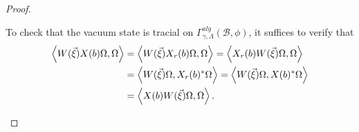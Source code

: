 \documentclass[10pt,a4paper]{amsart}
\newcommand{\br}{\medskip\noindent}
\newcommand{\ip}[2]{\left \langle{#1},{#2} \right \rangle}
\newcommand{\mc}[1]{\mathcal{#1}}
\begin{document}
\begin{proof}
\begin{enumerate}
\br
To check that the vacuum state is tracial on $\Gamma^{alg}_{\gamma, \Lambda}(\mc{B}, \phi)$, it suffices to verify that
\[
\begin{split}
\ip{W(\vec{\xi}) X(b) \Omega}{\Omega}
& = \ip{W(\vec{\xi}) X_r(b) \Omega}{\Omega}
= \ip{X_r(b) W(\vec{\xi}) \Omega}{\Omega} \\
& = \ip{W(\vec{\xi}) \Omega}{X_r(b)^\ast \Omega}
= \ip{W(\vec{\xi}) \Omega}{X(b)^\ast \Omega} \\
& = \ip{X(b) W(\vec{\xi}) \Omega}{\Omega}. \qedhere
\end{split}
\]
\end{enumerate}
\end{proof}
\end{document}
